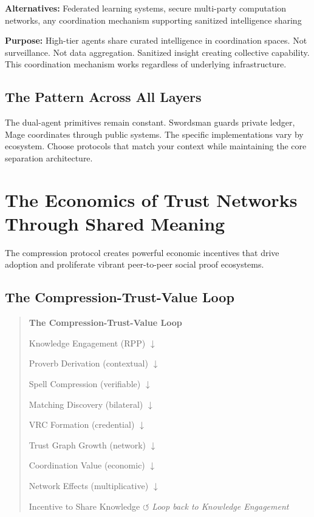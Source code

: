\documentclass[11pt,a4paper]{article}
\theoremstyle{definition}
\begin{document}
\textbf{Alternatives:} Federated learning systems, secure multi-party computation networks, any coordination mechanism supporting sanitized intelligence sharing

\textbf{Purpose:} High-tier agents share curated intelligence in coordination spaces. Not surveillance. Not data aggregation. Sanitized insight creating collective capability. This coordination mechanism works regardless of underlying infrastructure.

\subsection{The Pattern Across All Layers}

The dual-agent primitives remain constant. Swordsman guards private ledger, Mage coordinates through public systems. The specific implementations vary by ecosystem. Choose protocols that match your context while maintaining the core separation architecture.

\section{The Economics of Trust Networks Through Shared Meaning}

The compression protocol creates powerful economic incentives that drive adoption and proliferate vibrant peer-to-peer social proof ecosystems.

\subsection{The Compression-Trust-Value Loop}

\begin{quote}
\textbf{The Compression-Trust-Value Loop}

Knowledge Engagement (RPP) $\downarrow$

Proverb Derivation (contextual) $\downarrow$

Spell Compression (verifiable) $\downarrow$

Matching Discovery (bilateral) $\downarrow$

VRC Formation (credential) $\downarrow$

Trust Graph Growth (network) $\downarrow$

Coordination Value (economic) $\downarrow$

Network Effects (multiplicative) $\downarrow$

Incentive to Share Knowledge $\circlearrowleft$ \textit{Loop back to Knowledge Engagement}
\end{quote}
\end{document}
